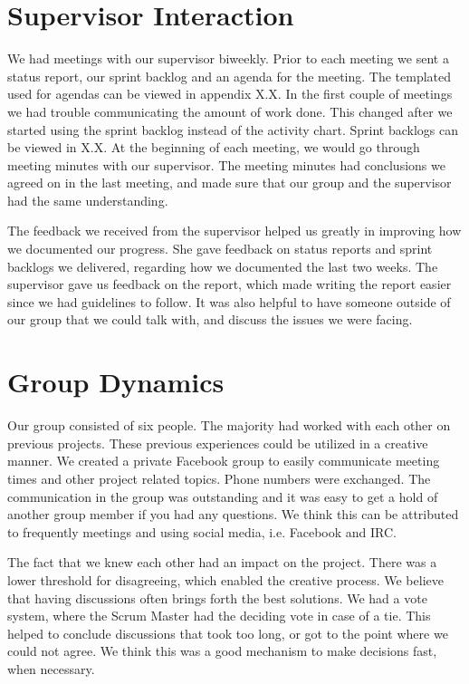 \pagebreak
\section{Supervisor Interaction}

We had meetings with our supervisor biweekly. Prior to each meeting we
sent a status report, our sprint backlog and an agenda for the meeting.
The templated used for agendas can be viewed in appendix X.X. In the
first couple of meetings we had trouble communicating the amount of
work done. This changed after we started using the sprint backlog
instead of the activity chart. Sprint backlogs can be viewed in X.X. At
the beginning of each meeting, we would go through meeting minutes with
our supervisor. The meeting minutes had conclusions we agreed on in the
last meeting, and made sure that our group and the supervisor had the
same understanding. \ 

The feedback we received from the supervisor helped us greatly in
improving how we documented our progress. She gave feedback on status
reports and sprint backlogs we delivered, regarding how we documented
the last two weeks. The supervisor gave us feedback on the report,
which made writing the report easier since we had guidelines to follow.
It was also helpful to have someone outside of our group that we could
talk with, and discuss the issues we were facing.

\section{Group Dynamics}

Our group consisted of six people. The majority had worked with each
other on previous projects. These previous experiences could be
utilized in a creative manner. We created a private Facebook group to
easily communicate meeting times and other project related topics.
Phone numbers were exchanged. The communication in the group was
outstanding and it was easy to get a hold of another group member if
you had any questions. We think this can be attributed to frequently
meetings and using social media, i.e. Facebook and IRC.

The fact that we knew each other had an impact on the project. There was
a lower threshold for disagreeing, which enabled the creative process.
We believe that having discussions often brings forth the best
solutions. We had a vote system, where the Scrum Master had the
deciding vote in case of a tie. This helped to conclude discussions
that took too long, or got to the point where we could not agree. We
think this was a good mechanism to make decisions fast, when necessary.


